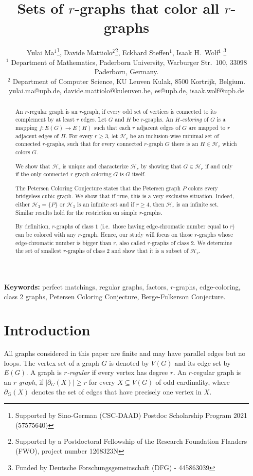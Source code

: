 \documentclass[a4paper,11pt]{article}
\title{Sets of $r$-graphs that color all $r$-graphs}
\author{Yulai Ma$^1$\thanks{Supported by Sino-German (CSC-DAAD) Postdoc Scholarship Program 2021 (57575640)}, Davide Mattiolo$^2$\thanks{Supported by a Postdoctoral Fellowship of the Research Foundation Flanders (FWO), project number 1268323N}, Eckhard Steffen$^1$, Isaak H.~Wolf$^1$ \thanks{Funded by Deutsche Forschungsgemeinschaft (DFG) - 445863039} \\
\footnotesize
		$^1$ Department of Mathematics, Paderborn University, Warburger Str.\ 100, 33098 Paderborn,
		Germany.
	\\
	\footnotesize
	$^2$ Department of Computer Science, KU Leuven Kulak, 8500 Kortrijk, Belgium.
\\ \footnotesize yulai.ma@upb.de, davide.mattiolo@kuleuven.be, es@upb.de, isaak.wolf@upb.de}
\date{}
\newcommand{\ca}{\mathcal}
\theoremstyle{remark}
\begin{document}
\maketitle

\begin{abstract}
An $r$-regular graph is an $r$-graph, if every odd set of vertices is connected to its complement by at least $r$ edges. Let $G$ and $H$ be $r$-graphs. An \emph{$H$-coloring} of $G$ is a mapping 
$f\colon E(G) \to E(H)$ such that each $r$ adjacent edges of $G$ are mapped to $r$ adjacent edges of $H$. For every $r\geq 3$, let $\ca H_r$ be an inclusion-wise minimal set of connected $r$-graphs, such that for every connected $r$-graph $G$ there is an $H \in \ca H_r$ which colors $G$.

We show that $\ca H_r$ is unique and characterize $\ca H_r$ by showing that 
$G \in \ca H_r$ if and only if the only connected $r$-graph coloring $G$ is $G$ itself. 

The Petersen Coloring Conjecture states that the Petersen graph $P$ colors every bridgeless cubic graph. 
We show  that if true, this is a very exclusive situation. 
Indeed, either $\ca H_3 = \{P\}$ or $\ca H_3$ is an infinite set and if
$r \geq 4$, then $\ca H_r$ is an infinite set. Similar results hold for the restriction on simple $r$-graphs.    

By definition, $r$-graphs of class $1$ (i.e.\ those having edge-chromatic number equal to $r$) can be colored with any $r$-graph.
Hence, our study will focus on those $r$-graphs whose edge-chromatic number is bigger than $r$, also called $r$-graphs of class $2$. We determine the set of smallest $r$-graphs of class 2 and show that it is a subset of $\ca H_r$.



\end{abstract}

{\bf Keywords:} perfect matchings, regular graphs, factors, $r$-graphs, edge-coloring, class 2 graphs, Petersen Coloring Conjecture, Berge-Fulkerson Conjecture.


\section{Introduction}
All graphs considered in this paper are finite and may have parallel edges 
but no loops.
The vertex set of a graph $G$ is denoted by $V(G)$ and its edge set by $E(G)$. 
A graph is \emph{$r$-regular} if every vertex has degree $r$. An
$r$-regular graph is an \emph{$r$-graph}, if $|\partial_G(X)| \geq r$ for every $X \subseteq V(G)$ of odd cardinality, where $\partial_G(X)$ denotes the set of edges 
that have precisely one vertex in $X$. 
\end{document}
